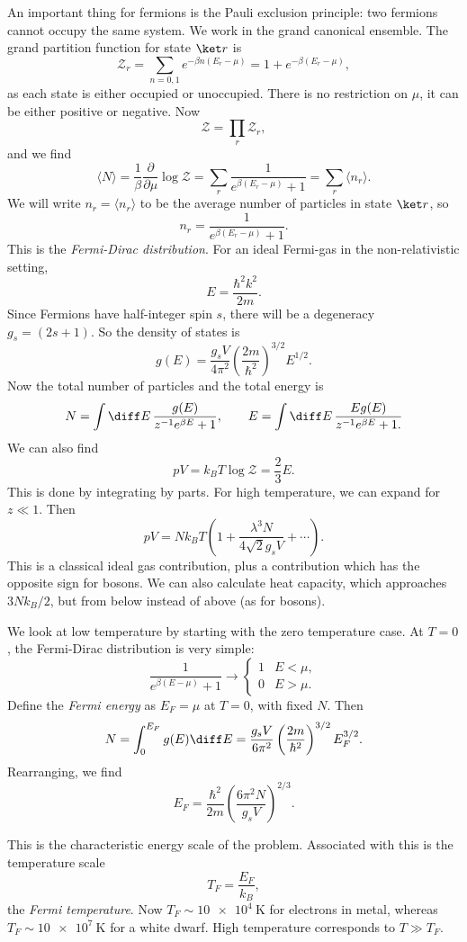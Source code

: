 \documentclass[12pt]{article}
\begin{document}
An important thing for fermions is the Pauli exclusion principle: two fermions cannot occupy the same system. We work in the grand canonical ensemble. The grand partition function for state $\ket r$ is
\[
\mathcal{Z}_r = \sum_{n = 0, 1} e^{-\beta n (E_r - \mu)} = 1 + e^{-\beta(E_r - \mu)},
\]
as each state is either occupied or unoccupied. There is no restriction on $\mu$, it can be either positive or negative. Now
\[
\mathcal{Z} = \prod_r \mathcal{Z}_r,
\]
and we find
\[
\langle N\rangle = \frac{1}{\beta} \frac{\partial}{\partial \mu} \log \mathcal{Z} = \sum_r \frac{1}{e^{\beta(E_r - \mu)} + 1} = \sum_r \langle n_r \rangle.
\]
We will write $n_r = \langle n_r\rangle$ to be the average number of particles in state $\ket r$, so
\[
n_r = \frac{1}{e^{\beta(E_r - \mu)} + 1}.
\]
This is the \emph{Fermi-Dirac distribution}. For an ideal Fermi-gas in the non-relativistic setting,
\[
E = \frac{\hbar^2 k^2}{2m}.
\]
Since Fermions have half-integer spin $s$, there will be a degeneracy $g_s = (2s+1)$. So the density of states is
\[
g(E) = \frac{g_s V}{4 \pi^2} \left( \frac{2m}{\hbar^2} \right)^{3/2} E^{1/2}.
\]
Now the total number of particles and the total energy is
\[
N = \int \diff E \, \frac{g(E)}{z^{-1} e^{\beta E} + 1}, \qquad E = \int \diff E \, \frac{E g(E)}{z^{-1} e^{\beta E}  + 1.}
\]
We can also find
\[
p V = k_B T \log \mathcal{Z} = \frac{2}{3} E.
\]
This is done by integrating by parts. For high temperature, we can expand for $z \ll 1$. Then
\[
pV = N k_B T \left( 1 + \frac{\lambda^3 N}{4 \sqrt 2 g_s V} + \cdots \right).
\]
This is a classical ideal gas contribution, plus a contribution which has the opposite sign for bosons. We can also calculate heat capacity, which approaches $3 N k_B/2$, but from below instead of above (as for bosons).

We look at low temperature by starting with the zero temperature case. At $T = 0$, the Fermi-Dirac distribution is very simple:
\[
\frac{1}{e ^{\beta(E - \mu)} + 1} \to
\begin{cases}
	1 & E < \mu, \\
	0 & E > \mu.
\end{cases}
\]
Define the \emph{Fermi energy} as $E_F = \mu$ at $T = 0$, with fixed $N$. Then
\[
N = \int_0^{E_F} g(E) \diff E = \frac{g_s V}{6 \pi^2} \left( \frac{2m}{\hbar^2} \right)^{3/2} E_F^{3/2}.
\]
Rearranging, we find
\[
E_F = \frac{\hbar^2}{2m} \left( \frac{6 \pi^2 N}{g_s V} \right)^{2/3}.
\]

This is the characteristic energy scale of the problem. Associated with this is the temperature scale
\[
T_F = \frac{E_F}{k_B},
\]
the \emph{Fermi temperature}. Now $T_F \sim \qty{10e4}{\kelvin}$ for electrons in metal, whereas $T_F \sim \qty{10e7}{\kelvin}$ for a white dwarf. High temperature corresponds to $T \gg T_F$.
\end{document}
